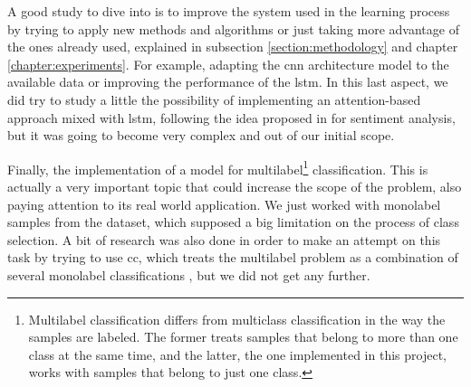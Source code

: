 	 A good study to dive into is to improve the system used in the learning process by trying to apply new methods and algorithms or just taking more advantage of the ones already used, explained in subsection \ref{section:methodology} and chapter \ref{chapter:experiments}. For example, adapting the \acrshort{cnn} architecture model to the available data or improving the performance of the \acrshort{lstm}. In this last aspect, we did try to study a little the possibility of implementing an attention-based approach mixed with \acrshort{lstm}, following the idea proposed in \cite{Wang2016a} for sentiment analysis, but it was going to become very complex and out of our initial scope.
	 
	 Finally, the implementation of a model for multilabel\footnote{Multilabel classification differs from multiclass classification in the way the samples are labeled. The former treats samples that belong to more than one class at the same time, and the latter, the one implemented in this project, works with samples that belong to just one class.} classification. This is actually a very important topic that could increase the scope of the problem, also paying attention to its real world application. We just worked with monolabel samples from the dataset, which supposed a big limitation on the process of class selection. A bit of research was also done in order to make an attempt on this task by trying to use \acrfull{cc}, which treats the multilabel problem as a combination of several monolabel classifications \cite{Read2011}, but we did not get any further.
	 